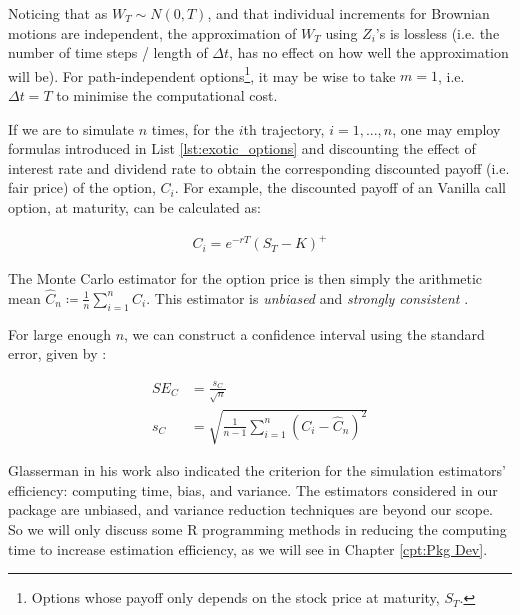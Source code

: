 Noticing that as $W_T\sim N(0,T)$, and that individual increments for Brownian motions are independent, the approximation of $W_T$ using $Z_i$'s is lossless (i.e. the number of time steps / length of $\Delta t$, has no effect on how well the approximation will be). For path-independent options\footnote{Options whose payoff only depends on the stock price at maturity, $S_T$.}, it may be wise to take $m=1$, i.e. $\Delta t=T$ to minimise the computational cost.

If we are to simulate $n$ times, for the $i$th trajectory, $i=1,...,n$, one may employ formulas introduced in List \ref{lst:exotic_options} and discounting the effect of interest rate and dividend rate to obtain the corresponding discounted payoff (i.e. fair price) of the option, $C_i$. For example, the discounted payoff of an Vanilla call option, at maturity, can be calculated as:

\begin{align} \label{eq:discount_vanilla_payoff}
C_i = e^{-rT}(S_T-K)^+
\end{align}

The Monte Carlo estimator for the option price is then simply the arithmetic mean $\hat{C}_n\coloneqq\frac{1}{n}\sum_{i=1}^{n}{C_i}$. This estimator is \textit{unbiased} and \textit{strongly consistent} \cite{Glasserman2003}.

For large enough $n$, we can construct a confidence interval using the standard error, given by \cite{Glasserman2003}:

\begin{align} \label{eq:mc_SE}
SE_C &= \frac{s_C}{\sqrt{n}} \\
 s_C &= \sqrt{\frac{1}{n-1}\sum_{i=1}^{n}{(C_i-\hat{C}_n)^2}}
\end{align}

Glasserman in his work \cite{Glasserman2003} also indicated the criterion for the simulation estimators' efficiency: computing time, bias, and variance. The estimators considered in our package are unbiased, and variance reduction techniques are beyond our scope. So we will only discuss some R programming methods in reducing the computing time to increase estimation efficiency, as we will see in Chapter \ref{cpt:Pkg Dev}.

\newpage